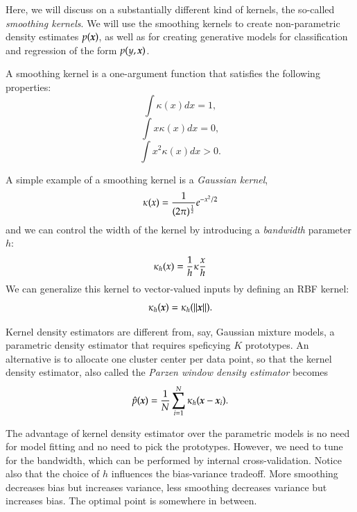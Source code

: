 \begin{refsection}
Here, we will discuss on a substantially different kind of kernels, the so-called {\em smoothing kernels}. We will use the smoothing kernels to create non-parametric density estimates $p(\boldsymbol{x})$, as well as for creating generative models for classification and regression of the form $p(y,\boldsymbol{x})$.

A smoothing kernel is a one-argument function that satisfies the following properties:
$$ \int \kappa(x)dx = 1, $$
$$ \int x\kappa(x)dx = 0, $$
$$ \int x^2\kappa(x)dx > 0. $$

A simple example of a smoothing kernel is a {\em Gaussian kernel},
$$ \kappa(x)={1\over (2\pi)^{1\over 2}} e^{-x^2/2} $$
and we can control the width of the kernel by introducing a {\em bandwidth} parameter $h$:
$$ \kappa_h(x)={1\over h}\kappa{x\over h} $$
We can generalize this kernel to vector-valued inputs by defining an RBF kernel:
$$ \kappa_h(\boldsymbol{x}) = \kappa_h(\left\lVert\boldsymbol{x}\right\rVert).$$

Kernel density estimators are different from, say, Gaussian mixture models, a parametric density estimator that requires speficying $K$ prototypes. An alternative is to allocate one cluster center per data point, so that the kernel density estimator, also called the {\em Parzen window density estimator} becomes
$$ \hat{p}(\boldsymbol{x}) = {1\over N}\sum_{i=1}^N \kappa_h(\boldsymbol{x}-\boldsymbol{x}_i).$$

The advantage of kernel density estimator over the parametric models is no need for model fitting and no need to pick the prototypes. However, we need to tune for the bandwidth, which can be performed by internal cross-validation. Notice also that the choice of $h$ influences the bias-variance tradeoff. More smoothing decreases bias but increases variance, less smoothing decreases variance but increases bias. The optimal point is somewhere in between. 



\printbibliography[heading=subbibliography]
\end{refsection}



